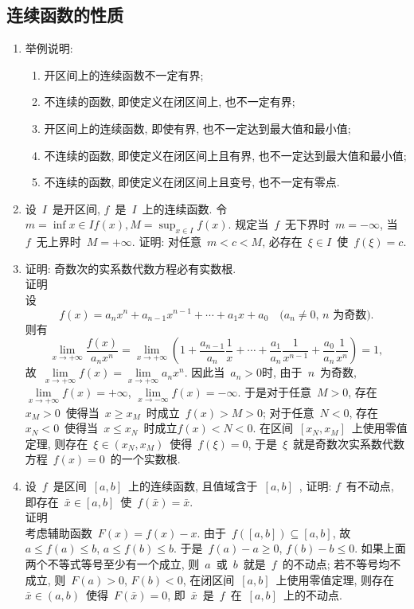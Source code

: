 \documentclass[UTF8,a4paper,20pt]{article}
\begin{document}
\subsection{连续函数的性质}
\begin{enumerate}[1.]
\item 举例说明:
	\begin{enumerate}[(1)]
	\item 开区间上的连续函数不一定有界;
	\item 不连续的函数, 即使定义在闭区间上, 也不一定有界;
	\item 开区间上的连续函数, 即使有界, 也不一定达到最大值和最小值; 
	\item 不连续的函数, 即使定义在闭区间上且有界, 也不一定达到最大值和最小值;
	\item 不连续的函数, 即使定义在闭区间上且变号, 也不一定有零点.
	\end{enumerate}

\item 设~$I$~是开区间, $f$~是~$I$~上的连续函数. 令~$m=\inf{x\in I}{f(x)}, M=\sup_{x\in I}{f(x)}$. 规定当~$f$~无下界时~$m=-\infty$, 当~$f$~无上界时~$M=+\infty$. 证明: 对任意~$m<c<M$, 必存在~$\xi\in I$~使~$f(\xi)=c$. 

\item 证明: 奇数次的实系数代数方程必有实数根. \\
{\heiti 证明}\\
设
\[f(x)=a_nx^n+a_{n-1}x^{n-1}+\cdots+a_1x+a_0 \quad\text{($a_n\neq 0$, $n$~为奇数)}.\]
则有
\[ \lim\limits_{x\to+\infty}\dfrac{f(x)}{a_nx^n}=\lim\limits_{x\to+\infty}(1+\dfrac{a_{n-1}}{a_n}\dfrac{1}{x}+\cdots+\dfrac{a_1}{a_n}\dfrac{1}{x^{n-1}}+\dfrac{a_0}{a_n}\dfrac{1}{x^n})=1,\]
故~$\lim\limits_{x\to+\infty} f(x)=\lim\limits_{x\to+\infty} a_nx^n$. 因此当~$a_n>0$时, 由于~$n$~为奇数,  $\lim\limits_{x\to+\infty}f(x)=+\infty$, $\lim\limits_{x\to-\infty}f(x)=-\infty$. 于是对于任意~$M>0$, 存在~$x_M>0$~使得当~$x\geqslant x_M$~时成立~$f(x)>M>0$; 对于任意~$N<0$, 存在~$x_N<0$~使得当~$x\leqslant x_N$~时成立$f(x)<N<0$. 在区间~$[x_N,x_M]$~上使用零值定理, 则存在~$\xi\in(x_N,x_M)$~使得~$f(\xi)=0$, 于是~$\xi$~就是奇数次实系数代数方程~$f(x)=0$~的一个实数根.

\item 设~$f$~是区间~$[a,b]$~上的连续函数, 且值域含于~$[a,b]$~, 证明: $f$~有不动点, 即存在~$\bar{x}\in[a,b]$~使~$f(\bar{x})=\bar{x}$.\\
{\heiti 证明}\\
考虑辅助函数~$F(x)=f(x)-x$. 由于~$f([a,b])\subseteq [a,b]$, 故~$a\leqslant f(a)\leqslant b$, $a\leqslant f(b)\leqslant b$. 于是~$f(a)-a\geqslant 0$, $f(b)-b\leqslant 0$. 如果上面两个不等式等号至少有一个成立, 则~$a$~或~$b$~就是~$f$~的不动点; 若不等号均不成立, 则~$F(a)>0$, $F(b)<0$, 在闭区间~$[a,b]$~上使用零值定理, 则存在~$\bar{x}\in(a,b)$~使得~$F(\bar{x})=0$, 即~$\bar{x}$~是~$f$~在~$[a,b]$~上的不动点.


\end{enumerate}
\end{document}
